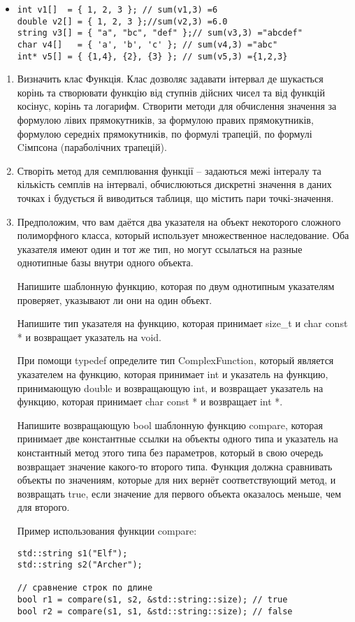 \documentclass[]{article}
\begin{document}
\begin{itemize}
\item
\begin{verbatim}
int v1[]  = { 1, 2, 3 }; // sum(v1,3) =6 
double v2[] = { 1, 2, 3 };//sum(v2,3) =6.0 
string v3[] = { "a", "bc", "def" };// sum(v3,3) ="abcdef"
char v4[]   = { 'a', 'b', 'c' }; // sum(v4,3) ="abc"
int* v5[] = { {1,4}, {2}, {3} }; // sum(v5,3) ={1,2,3}
\end{verbatim}
\end{itemize}

\begin{enumerate}
\def\labelenumi{\arabic{enumi}.}
\item
  Визначить клас Функція. Клас дозволяє задавати інтервал де шукається
  корінь та створювати функцію від ступнів дійсних чисел та від функцій
  косінус, корінь та логарифм. Створити методи для обчислення значення
  за формулою лівих прямокутників, за формулою правих прямокутників,
  формулою середніх прямокутників, по формулі трапецій, по формулі
  Cімпсона (параболічних трапецій).

\item
  Створіть метод для семплювання функції -- задаються межі інтералу та
  кількість семплів на інтервалі, обчислюються дискретні значення в
  даних точках і будується й виводиться таблиця, що містить пари
  точкі-значення.

\item
Предположим, что вам даётся два указателя на объект некоторого сложного полиморфного класса, который использует множественное наследование. Оба указателя имеют один и тот же тип, но могут ссылаться на разные однотипные базы внутри одного объекта.

Напишите шаблонную функцию, которая по двум однотипным указателям проверяет, указывают ли они на один объект.


Напишите тип указателя на функцию, которая принимает size\_t и char const * и возвращает указатель на void.

При помощи typedef определите тип ComplexFunction, который является указателем на функцию, которая принимает int и указатель на функцию, принимающую double и возвращающую int, и возвращает указатель на функцию, которая принимает char const * и возвращает int *.

Напишите возвращающую bool шаблонную функцию compare, которая принимает две константные ссылки на объекты одного типа и указатель на константный метод этого типа без параметров, который в свою очередь возвращает значение какого-то второго типа. Функция должна сравнивать объекты по значениям, которые для них вернёт соответствующий метод, и возвращать true, если значение для первого объекта оказалось меньше, чем для второго.

Пример использования функции compare:
\begin{verbatim}
std::string s1("Elf");
std::string s2("Archer");

// сравнение строк по длине
bool r1 = compare(s1, s2, &std::string::size); // true
bool r2 = compare(s1, s1, &std::string::size); // false

\end{verbatim}

\end{enumerate}
\end{document}
